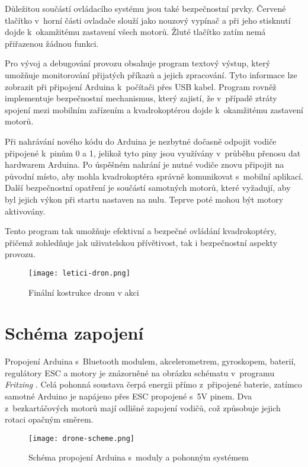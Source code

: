 \documentclass[12pt]{report}
\begin{document}
Důležitou součástí ovládacího systému jsou také bezpečnostní prvky. Červené tlačítko v~horní části ovladače slouží jako nouzový vypínač a při jeho stisknutí dojde k~okamžitému zastavení všech motorů. Žluté tlačítko zatím nemá přiřazenou žádnou funkci.

Pro vývoj a debugování provozu obsahuje program textový výstup, který umožňuje monitorování přijatých příkazů a jejich zpracování. Tyto informace lze zobrazit při připojení Arduina k~počítači přes USB kabel. Program rovněž implementuje bezpečnostní mechanismus, který zajistí, že v~případě ztráty spojení mezi mobilním zařízením a kvadrokoptérou dojde k~okamžitému zastavení motorů.

Při nahrávání nového kódu do Arduina je nezbytné dočasně odpojit vodiče připojené k~pinům 0 a 1, jelikož tyto piny jsou využívány v~průběhu přenosu dat hardwarem Arduina. Po úspěšném nahrání je nutné vodiče znovu připojit na původní místo, aby mohla kvadrokoptéra správně komunikovat s~mobilní aplikací. Další bezpečnostní opatření je součástí samotných motorů, které vyžadují, aby byl jejich výkon při startu nastaven na nulu. Teprve poté mohou být motory aktivovány.

Tento program tak umožňuje efektivní a bezpečné ovládání kvadrokoptéry, přičemž zohledňuje jak uživatelskou přívětivost, tak i bezpečnostní aspekty provozu.

\begin{figure}[H]
	\centering
	\texttt{[image: letici-dron.png]}
	\caption{Finální kostrukce dronu v akci}
	\label{fig:letici-dron.png}
\end{figure}

\chapter[Schéma zapojení]{Schéma zapojení}
Propojení Arduina s~Bluetooth modulem, akcelerometrem, gyroskopem, baterií, regulátory ESC a motory je znázorněné na obrázku schématu v~programu \textit{Fritzing} \cite{fritzing}. Celá pohonná soustava čerpá energii přímo z~připojené baterie, zatímco samotné Arduino je napájeno přes ESC propojené s~5V pinem. Dva z~bezkartáčových motorů mají odlišné zapojení vodičů, což způsobuje jejich rotaci opačným směrem.

\vspace{40pt}
\begin{figure}[H]
	\centering
	\texttt{[image: drone-scheme.png]}
	\caption{Schéma propojení Arduina s~moduly a pohonným systémem \cite{fritzing}}
	\label{fig:drone-scheme.png}
\end{figure}
\end{document}
